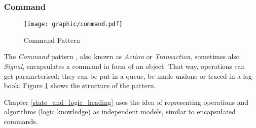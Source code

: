 %
%
%
%
%
%
%

\subsubsection{Command}
\label{command_heading}

\begin{figure}[ht]
    \begin{center}
        \texttt{[image: graphic/command.pdf]}
        \caption{Command Pattern}
        \label{command_figure}
    \end{center}
\end{figure}

The \emph{Command} pattern \cite{gamma1995}, also known as \emph{Action} or
\emph{Transaction}, sometimes also \emph{Signal}, encapsulates a command in
form of an object. That way, operations can get parameterised; they can be put
in a queue, be made undone or traced in a log book. Figure \ref{command_figure}
shows the structure of the pattern.

Chapter \ref{state_and_logic_heading} uses the idea of representing operations
and algorithms (logic knowledge) as independent models, similar to encapsulated
commands.
